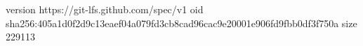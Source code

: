 version https://git-lfs.github.com/spec/v1
oid sha256:405a1d0f2d9c13eaef04a079fd3cb8cad96cac9e20001e906fd9fbb0df3f750a
size 229113
